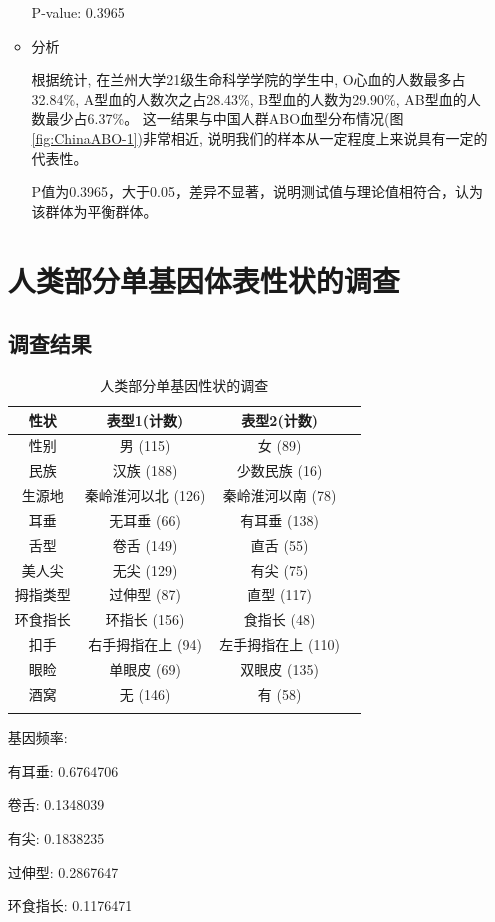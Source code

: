 \documentclass[AutoFakeBold]{LZUThesis}
\begin{document}
\begin{enumerate}
\begin{itemize}
    P-value: 0.3965

    \item 分析\par
    根据统计, 在兰州大学21级生命科学学院的学生中, O心血的人数最多占32.84\%, A型血的人数次之占28.43\%, B型血的人数为29.90\%, AB型血的人数最少占6.37\%。
    这一结果与中国人群ABO血型分布情况(图\ref{fig:ChinaABO-1})非常相近, 说明我们的样本从一定程度上来说具有一定的代表性。

    P值为0.3965，大于0.05，差异不显著，说明测试值与理论值相符合，认为该群体为平衡群体。

\end{itemize}
\section{人类部分单基因体表性状的调查}
\subsection{调查结果}
\begin{longtable}{cccc}
    \toprule
    性状    & 表型1(计数)  & 表型2(计数)   \\
    \midrule
    性别 & 男 (115) & 女 (89) \\
    民族 & 汉族 (188) & 少数民族 (16) \\
    生源地 & 秦岭淮河以北 (126) & 秦岭淮河以南 (78) \\
    耳垂 & 无耳垂 (66) & 有耳垂 (138) \\
    舌型 & 卷舌 (149) & 直舌 (55) \\
    美人尖 & 无尖 (129) & 有尖 (75) \\
    拇指类型 & 过伸型 (87) & 直型 (117) \\
    环食指长 & 环指长 (156) & 食指长 (48) \\
    扣手 & 右手拇指在上 (94) & 左手拇指在上 (110) \\
    眼睑 & 单眼皮 (69) & 双眼皮 (135) \\
    酒窝 & 无 (146) & 有 (58) \\
    \bottomrule
    \caption{人类部分单基因性状的调查}
\end{longtable}

基因频率:

有耳垂: 0.6764706

卷舌: 0.1348039

有尖: 0.1838235

过伸型: 0.2867647

环食指长: 0.1176471


\end{enumerate}
\end{document}
